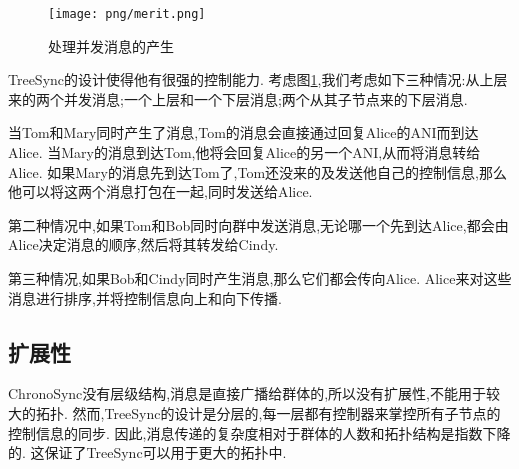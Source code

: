 \begin{figure}
\centering
\texttt{[image: png/merit.png]}
\caption{处理并发消息的产生}
\label{merit}
\end{figure}

TreeSync的设计使得他有很强的控制能力.
考虑图\ref{merit},我们考虑如下三种情况:从上层来的两个并发消息;一个上层和一个下层消息;两个从其子节点来的下层消息.

当Tom和Mary同时产生了消息,Tom的消息会直接通过回复Alice的ANI而到达Alice.
当Mary的消息到达Tom,他将会回复Alice的另一个ANI,从而将消息转给Alice.
如果Mary的消息先到达Tom了,Tom还没来的及发送他自己的控制信息,那么他可以将这两个消息打包在一起,同时发送给Alice.

第二种情况中,如果Tom和Bob同时向群中发送消息,无论哪一个先到达Alice,都会由Alice决定消息的顺序,然后将其转发给Cindy.

第三种情况,如果Bob和Cindy同时产生消息,那么它们都会传向Alice.
Alice来对这些消息进行排序,并将控制信息向上和向下传播.

\subsection{扩展性}

ChronoSync没有层级结构,消息是直接广播给群体的,所以没有扩展性,不能用于较大的拓扑.
然而,TreeSync的设计是分层的,每一层都有控制器来掌控所有子节点的控制信息的同步.
因此,消息传递的复杂度相对于群体的人数和拓扑结构是指数下降的.
这保证了TreeSync可以用于更大的拓扑中.
